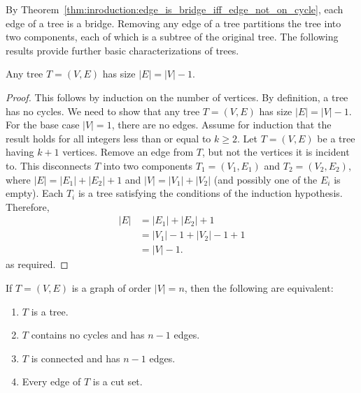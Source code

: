 By Theorem~\ref{thm:inroduction:edge_is_bridge_iff_edge_not_on_cycle},
each edge of a tree is a bridge. Removing any edge of a tree
partitions the tree into two components, each of which is a subtree of
the original tree. The following results provide further basic
characterizations of trees.

\begin{theorem}
\label{thm:trees_forests:each_tree_has_size_n_minus_one}
Any tree $T = (V,E)$ has size $|E| = |V| - 1$.
\end{theorem}

\begin{proof}
This follows by induction on the number of vertices. By definition, a
tree has no cycles. We need to show that any tree $T = (V,E)$ has size
$|E| = |V| - 1$. For the base case $|V| = 1$, there are no
edges. Assume for induction that the result holds for all integers
less than or equal to $k \geq 2$. Let $T = (V,E)$ be a tree having
$k + 1$ vertices. Remove an edge from $T$, but not the vertices it is
incident to. This disconnects $T$ into two components
$T_1 = (V_1, E_1)$ and $T_2 = (V_2, E_2)$, where
$|E| = |E_1| + |E_2| + 1$ and $|V| = |V_1| + |V_2|$ (and possibly one
of the $E_i$ is empty). Each $T_i$ is a tree satisfying the conditions
of the induction hypothesis. Therefore,
\begin{align*}
|E|
&=
|E_1| + |E_2| + 1 \\[4pt]
&=
|V_1| - 1 + |V_2| - 1 + 1 \\[4pt]
&=
|V| - 1.
\end{align*}
as required.
\end{proof}

\begin{corollary}
If $T = (V,E)$ is a graph of order $|V| = n$, then the following are
equivalent:
\begin{enumerate}
\item\label{enu:trees_forests:is_tree} $T$ is a tree.

\item\label{enu:trees_forests:no_cycles_n_minus_one_edges} $T$
  contains no cycles and has $n - 1$ edges.

\item\label{enu:trees_forests:connected_n_minus_one_edges} $T$ is
  connected and has $n - 1$ edges.

\item\label{enu:trees_forests:each_edge_is_cut_set} Every edge of $T$
  is a cut set.
\end{enumerate}
\end{corollary}

